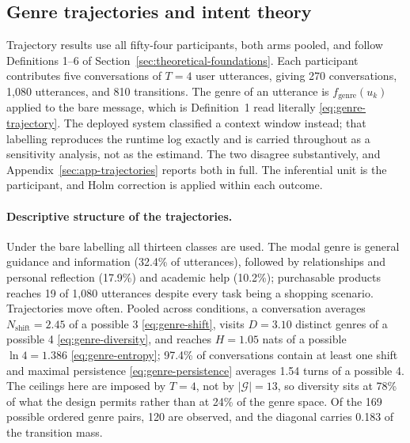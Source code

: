 \subsection{Genre trajectories and intent theory}
\label{sec:results-trajectories}

Trajectory results use all fifty-four participants, both arms pooled, and follow Definitions 1--6 of Section~\ref{sec:theoretical-foundations}. Each participant contributes five conversations of \(T=4\) user utterances, giving 270 conversations, 1{,}080 utterances, and 810 transitions. The genre of an utterance is \(f_{\mathrm{genre}}(u_k)\) applied to the bare message, which is Definition~1 read literally \eqref{eq:genre-trajectory}. The deployed system classified a context window instead; that labelling reproduces the runtime log exactly and is carried throughout as a sensitivity analysis, not as the estimand. The two disagree substantively, and Appendix~\ref{sec:app-trajectories} reports both in full. The inferential unit is the participant, and Holm correction is applied within each outcome.

\paragraph{Descriptive structure of the trajectories.}
Under the bare labelling all thirteen classes are used. The modal genre is general guidance and information (32.4\% of utterances), followed by relationships and personal reflection (17.9\%) and academic help (10.2\%); purchasable products reaches 19 of 1{,}080 utterances despite every task being a shopping scenario. Trajectories move often. Pooled across conditions, a conversation averages \(N_{\mathrm{shift}}=2.45\) of a possible 3 \eqref{eq:genre-shift}, visits \(D=3.10\) distinct genres of a possible 4 \eqref{eq:genre-diversity}, and reaches \(H=1.05\) nats of a possible \(\ln 4 = 1.386\) \eqref{eq:genre-entropy}; 97.4\% of conversations contain at least one shift and maximal persistence \eqref{eq:genre-persistence} averages 1.54 turns of a possible 4. The ceilings here are imposed by \(T=4\), not by \(|\mathcal{G}|=13\), so diversity sits at 78\% of what the design permits rather than at 24\% of the genre space. Of the 169 possible ordered genre pairs, 120 are observed, and the diagonal carries 0.183 of the transition mass.

